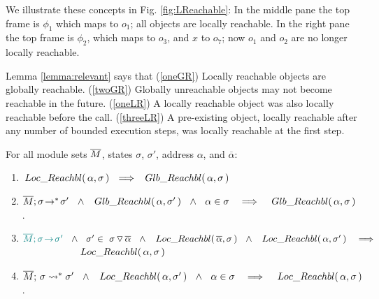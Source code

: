 We illustrate these concepts in Fig. \ref{fig:LReachable}: In the middle pane the top frame is $\phi_1$ which maps  to $o_1$; all objects are locally reachable. 
In the right pane the top frame is $\phi_2$, which maps  to $o_3$, and $x$ to $o_7$; now $o_1$ and $o_2$ are no longer locally reachable.

Lemma  \ref{lemma:relevant} %
says that  (\ref{oneGR}) Locally reachable objects are globally reachable. 
(\ref{twoGR}) 
Globally unreachable objects may not become reachable in the future.
(\ref{oneLR}) A locally reachable object   was also locally reachable before  the call.
(\ref{threeLR}) A pre-existing object, locally reachable after any number of bounded execution steps, was locally reachable at the first step.



\begin{lemma}
\label{lemma:relevant}
For all module sets $\overline{M}$, states $\sigma$, $\sigma'$,   address $\alpha$, and $\overline \alpha$:
\begin{enumerate}
\item
\label{oneGR}
$ \LRelevant \alpha \sigma\ \ \Longrightarrow \ \   \GRelevant \alpha \sigma$
\item
\label{twoGR}
${\leadstoOrigStar {\Mtwo}  {\sigma}  {\sigma'}} \ \ \wedge \ \  \GRelevant \alpha {\sigma'} \ \ \wedge\ \  {\alpha\in \sigma} \ \ \ \Longrightarrow \ \  \ \GRelevant \alpha {\sigma}$.
\item
\label{oneLR}
{$\sdN{\leadstoOrig  {\Mtwo}  {\sigma}  {\sigma'}} \ \ \wedge\ \  \sigma'\in \PushS {\alpha} {\sigma}  \ \ \wedge \ \  \LRelevant {\overline \alpha} {\sigma} \ \ \wedge\ \   \LRelevant \alpha {\sigma'} \ \ \ \Longrightarrow$
\\
$\strut \hspace{2cm} \,Loc\_Reachbl(\,\alpha,\sigma\,)$
}
\item
\label{threeLR}
${\leadstoBoundedStar {\Mtwo}  {\sigma}    {\sigma'}} \ \ \wedge \ \   \LRelevant \alpha {\sigma'}\  \ \wedge\ \  {\alpha\in \sigma} \ \ \ \Longrightarrow \ \ \ \LRelevant \alpha {\sigma}$.
\end{enumerate}
\end{lemma}

